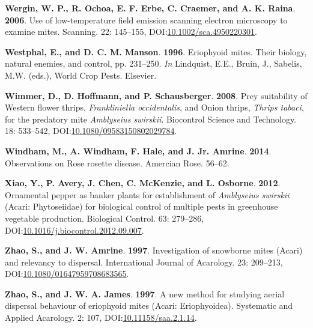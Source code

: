 \documentclass[12pt,final,CPage]{ufthesis}
\newlength{\cslhangindent}
\newenvironment{CSLReferences}[2] %
{%
	\setlength{\parindent}{0pt}
	\ifodd #1 \everypar{\setlength{\hangindent}{\cslhangindent}}\ignorespaces\fi
	\ifnum #2 > 0
	\setlength{\parskip}{#2\baselineskip}
	\fi
}%
{}
\begin{document}
{\begin{CSLReferences}{1}{0}
  \leavevmode{}%
  \textbf{Wergin, W. P., R. Ochoa, E. F. Erbe, C. Craemer, and A. K. Raina}. \textbf{2006}. Use of low-temperature field emission scanning electron microscopy to examine mites. Scanning. 22: 145--155, DOI:\href{https://doi.org/10.1002/sca.4950220301}{10.1002/sca.4950220301}.

  \leavevmode{}%
  \textbf{Westphal, E., and D. C. M. Manson}. \textbf{1996}. Eriophyoid mites. Their biology, natural enemies, and control, pp. 231--250. \emph{In} Lindquist, E.E., Bruin, J., Sabelis, M.W. (eds.), World Crop Pests. Elsevier.

  \leavevmode{}%
  \textbf{Wimmer, D., D. Hoffmann, and P. Schausberger}. \textbf{2008}. Prey suitability of {Western flower thrips}, {\emph{Frankliniella occidentalis}}, and {Onion thrips}, {\emph{Thrips tabaci}}, for the predatory mite {\emph{Amblyseius swirskii}}. Biocontrol Science and Technology. 18: 533--542, DOI:\href{https://doi.org/10.1080/09583150802029784}{10.1080/09583150802029784}.

  \leavevmode{}%
  \textbf{Windham, M., A. Windham, F. Hale, and J. Jr. Amrine}. \textbf{2014}. Observations on {Rose rosette disease}. Amercian Rose. 56--62.

  \leavevmode{}%
  \textbf{Xiao, Y., P. Avery, J. Chen, C. McKenzie, and L. Osborne}. \textbf{2012}. Ornamental pepper as banker plants for establishment of {\emph{Amblyseius swirskii}} ({Acari}: {Phytoseiidae}) for biological control of multiple pests in greenhouse vegetable production. Biological Control. 63: 279--286, DOI:\href{https://doi.org/10.1016/j.biocontrol.2012.09.007}{10.1016/j.biocontrol.2012.09.007}.

  \leavevmode{}%
  \textbf{Zhao, S., and J. W. Amrine}. \textbf{1997}. Investigation of snowborne mites ({Acari}) and relevancy to dispersal. International Journal of Acarology. 23: 209--213, DOI:\href{https://doi.org/10.1080/01647959708683565}{10.1080/01647959708683565}.

  \leavevmode{}%
  \textbf{Zhao, S., and J. W. A. James}. \textbf{1997}. A new method for studying aerial dispersal behaviour of eriophyoid mites ({Acari}: {Eriophyoidea}). Systematic and Applied Acarology. 2: 107, DOI:\href{https://doi.org/10.11158/saa.2.1.14}{10.11158/saa.2.1.14}.


\end{CSLReferences}}
\end{document}

